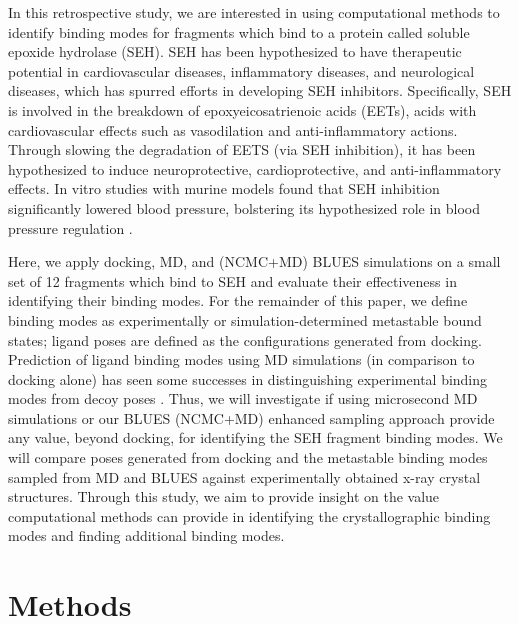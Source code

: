 In this retrospective study, we are interested in using computational methods to identify binding modes for fragments which bind to a protein called soluble epoxide hydrolase (SEH).
SEH has been hypothesized to have therapeutic potential in cardiovascular diseases, inflammatory diseases, and neurological diseases, which has spurred efforts in developing SEH inhibitors.
Specifically, SEH is involved in the breakdown of epoxyeicosatrienoic acids (EETs), acids with cardiovascular effects such as vasodilation and anti-inflammatory actions.
Through slowing the degradation of EETS (via SEH inhibition), it has been hypothesized to induce neuroprotective, cardioprotective, and anti-inflammatory effects.
In vitro studies with murine models found that SEH inhibition significantly lowered blood pressure, bolstering its hypothesized role in blood pressure regulation \cite{morisseau_impact_2013,morisseau_epoxide_2005,kodani_2014_2015}.

Here, we apply docking, MD, and (NCMC+MD) BLUES simulations on a small set of 12 fragments which bind to SEH and evaluate their effectiveness in identifying their binding modes.
For the remainder of this paper, we define binding modes as experimentally or simulation-determined metastable bound states; ligand poses are defined as the configurations generated from docking.
Prediction of ligand binding modes using MD simulations (in comparison to docking alone) has seen some successes in distinguishing experimental binding modes from decoy poses \cite{liu_exploring_2017,clark_prediction_2016}.
Thus, we will investigate if using microsecond MD simulations or our BLUES  (NCMC+MD) enhanced sampling approach provide any value, beyond docking, for identifying the SEH fragment binding modes.
We will compare poses generated from docking and the metastable binding modes sampled from MD and BLUES against experimentally obtained x-ray crystal structures.
Through this study, we aim to provide insight on the value computational methods can provide in identifying the crystallographic binding modes and finding additional binding modes.

\section{Methods}
